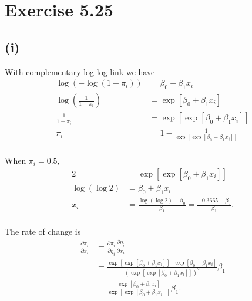 \section*{Exercise 5.25}

\subsection*{(i)}
With complementary log-log link we have
\begin{align*}
\log\left(-\log(1-\pi_{i})\right) &= \beta_{0} + \beta_{1}x_{i}\\
\log\left(\frac{1}{1-\pi_{i}}\right) &= \exp\left[\beta_{0} + \beta_{1}x_{i}\right]\\
\frac{1}{1-\pi_{i}} &= \exp\left[\exp\left[\beta_{0} + \beta_{1}x_{i}\right]\right]\\
\pi_{i} &= 1 - \frac{1}{\exp\left[\exp\left[\beta_{0} + \beta_{1}x_{i}\right]\right]}\\
\end{align*}

When $\pi_{i} = 0.5$,
\begin{align*}
2 &= \exp\left[\exp\left[\beta_{0} + \beta_{1}x_{i}\right]\right]\\
\log\left(\log 2\right) &= \beta_{0} + \beta_{1}x_{i}\\
x_{i} &= \frac{\log\left(\log 2\right) - \beta_{0}}{\beta_{1}} = \frac{-0.3665 -\beta_{0}}{\beta_{1}}.\\
\end{align*}

The rate of change is
\begin{align*}
\frac{\partial \pi_{i}}{\partial x_{i}} &= \frac{\partial \pi_{i}}{\partial \eta_{i}}\frac{\partial \eta_{i}}{\partial x_{i}}\\
&= \frac{\exp\left[\exp\left[\beta_{0} + \beta_{1}x_{i}\right]\right] \cdot \exp\left[\beta_{0} + \beta_{1}x_{i}\right]}{\left(\exp\left[\exp\left[\beta_{0} + \beta_{1}x_{i}\right]\right]\right)^{2}}\beta_{1}\\
&= \frac{\exp\left[\beta_{0} + \beta_{1}x_{i}\right]}{\exp\left[\exp\left[\beta_{0} + \beta_{1}x_{i}\right]\right]}\beta_{1}.
\end{align*}

